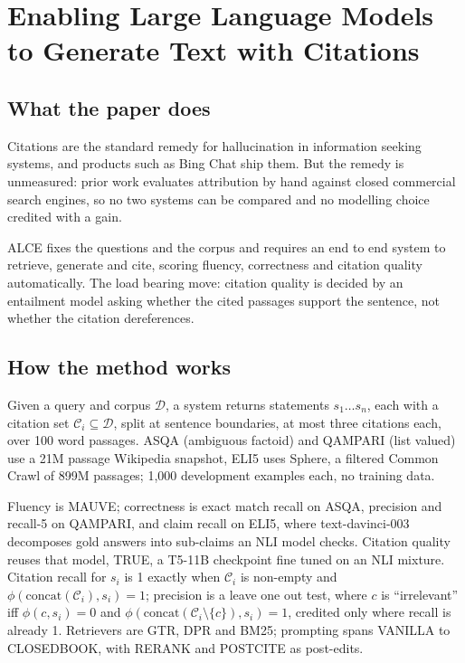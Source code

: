 \section{Enabling Large Language Models to Generate Text with Citations}

\subsection{What the paper does}

Citations are the standard remedy for hallucination in information seeking systems, and products such as Bing Chat ship them. But the remedy is unmeasured: prior work evaluates attribution by hand against closed commercial search engines, so no two systems can be compared and no modelling choice credited with a gain.

ALCE fixes the questions and the corpus and requires an end to end system to retrieve, generate and cite, scoring fluency, correctness and citation quality automatically. The load bearing move: citation quality is decided by an entailment model asking whether the cited passages support the sentence, not whether the citation dereferences.

\subsection{How the method works}

Given a query and corpus $\mathcal{D}$, a system returns statements $s_1 \dots s_n$, each with a citation set $\mathcal{C}_i \subseteq \mathcal{D}$, split at sentence boundaries, at most three citations each, over 100 word passages. ASQA (ambiguous factoid) and QAMPARI (list valued) use a 21M passage Wikipedia snapshot, ELI5 uses Sphere, a filtered Common Crawl of 899M passages; 1,000 development examples each, no training data.

Fluency is MAUVE; correctness is exact match recall on ASQA, precision and recall-5 on QAMPARI, and claim recall on ELI5, where text-davinci-003 decomposes gold answers into sub-claims an NLI model checks. Citation quality reuses that model, TRUE, a T5-11B checkpoint fine tuned on an NLI mixture. Citation recall for $s_i$ is 1 exactly when $\mathcal{C}_i$ is non-empty and $\phi(\mathrm{concat}(\mathcal{C}_i), s_i) = 1$; precision is a leave one out test, where $c$ is ``irrelevant'' iff $\phi(c, s_i) = 0$ and $\phi(\mathrm{concat}(\mathcal{C}_i \setminus \{c\}), s_i) = 1$, credited only where recall is already 1. Retrievers are GTR, DPR and BM25; prompting spans VANILLA to CLOSEDBOOK, with RERANK and POSTCITE as post-edits.

